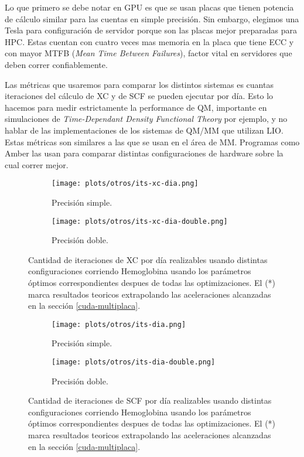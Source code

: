 
Lo que primero se debe notar en GPU es que se usan placas que tienen potencia de c\'alculo similar
para las cuentas en simple precisi\'on. Sin embargo, elegimos una Tesla para configuraci\'on de servidor
porque son las placas mejor preparadas para HPC. Estas cuentan con cuatro veces mas memoria en la placa
que tiene ECC y con mayor MTFB (\textit{Mean Time Between Failures}), factor vital en servidores
que deben correr confiablemente.

Las m\'etricas que usaremos para comparar los distintos sistemas es cuantas iteraciones del c\'alculo de
XC y de SCF se pueden ejecutar por d\'ia. Esto lo hacemos para medir estrictamente la performance
de QM, importante en simulaciones de \textit{Time-Dependant Density Functional Theory} por ejemplo, y no
hablar de las implementaciones de los sistemas de QM/MM que utilizan LIO.
Estas m\'etricas son similares a las que se usan en el \'area de MM. Programas como Amber\cite{Amber} las usan para comparar
distintas configuraciones de hardware sobre la cual correr mejor.

\begin{figure}[htbp]
\centering
  \begin{subfigure}[b]{\plotwidthtres}
    \texttt{[image: plots/otros/its-xc-dia.png]}
    \caption{Precisi\'on simple.}
  \end{subfigure}
  \begin{subfigure}[b]{\plotwidthtres}
    \texttt{[image: plots/otros/its-xc-dia-double.png]}
    \caption{Precisi\'on doble.}
  \end{subfigure}
  \caption{Cantidad de iteraciones de XC por d\'ia realizables usando distintas configuraciones corriendo Hemoglobina usando los
            par\'ametros \'optimos correspondientes despues de todas las optimizaciones. El (*) marca resultados teoricos extrapolando
            las aceleraciones alcanzadas en la secci\'on \ref{cuda-multiplaca}.}
  \label{fig:its-xc-dia}
\end{figure}


\begin{figure}[htbp]
\centering
  \begin{subfigure}[b]{\plotwidthtres}
    \texttt{[image: plots/otros/its-dia.png]}
    \caption{Precisi\'on simple.}
  \end{subfigure}
  \begin{subfigure}[b]{\plotwidthtres}
    \texttt{[image: plots/otros/its-dia-double.png]}
    \caption{Precisi\'on doble.}
  \end{subfigure}
    \caption{Cantidad de iteraciones de SCF por d\'ia realizables usando distintas configuraciones corriendo Hemoglobina usando los
              par\'ametros \'optimos correspondientes despues de todas las optimizaciones. El (*) marca resultados teoricos extrapolando
              las aceleraciones alcanzadas en la secci\'on \ref{cuda-multiplaca}.}
    \label{fig:its-dia}
\end{figure}

